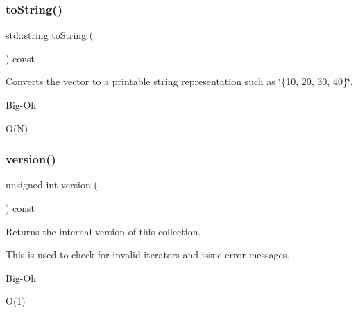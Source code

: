 \subsubsection{\texorpdfstring{to\+String()}{toString()}}
{\footnotesize\ttfamily std\+::string to\+String (\begin{DoxyParamCaption}{ }\end{DoxyParamCaption}) const}



Converts the vector to a printable string representation such as \char`\"{}\{10, 20, 30, 40\}\char`\"{}. 

\begin{DoxyRefDesc}{Big-\/\+Oh}
\item[\mbox{\hyperlink{BigOh__BigOh000138}{Big-\/\+Oh}}]O(\+N) \end{DoxyRefDesc}
\mbox{\label{classVector_a0aa696ccb72cbf928535d6b646bac1aa}} 
\subsubsection{\texorpdfstring{version()}{version()}}
{\footnotesize\ttfamily unsigned int version (\begin{DoxyParamCaption}{ }\end{DoxyParamCaption}) const}



Returns the internal version of this collection. 

This is used to check for invalid iterators and issue error messages. \begin{DoxyRefDesc}{Big-\/\+Oh}
\item[\mbox{\hyperlink{BigOh__BigOh000157}{Big-\/\+Oh}}]O(1) \end{DoxyRefDesc}

